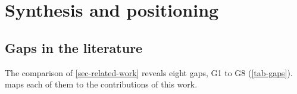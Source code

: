 \section{Synthesis and positioning}
\label{sec-synthesis}

\subsection{Gaps in the literature}
\label{subsec-gaps}

The comparison of \cref{sec-related-work} reveals eight gaps, G1 to G8
(\cref{tab-gaps}).  maps each of them to the
contributions of this work.

